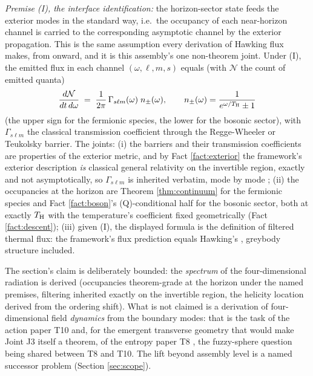 \begin{assembly}\label{asm:greybody}
\emph{Premise (I), the interface identification:} the horizon-sector state feeds the exterior modes in the standard way, i.e.\ the occupancy of each near-horizon channel is carried to the corresponding asymptotic channel by the exterior propagation. This is the same assumption every derivation of Hawking flux makes, from \cite{Hawking1975} onward, and it is this assembly's one non-theorem joint. Under (I), the emitted flux in each channel $(\omega, \ell, m, s)$ equals (with $\mathcal{N}$ the count of emitted quanta)
\[
\frac{d\mathcal{N}}{dt\,d\omega} \;=\; \frac{1}{2\pi}\,\Gamma_{s\ell m}(\omega)\; n_\pm(\omega), \qquad
n_\pm(\omega) = \frac{1}{e^{\omega/T_{\mathrm{H}}} \pm 1}
\]
(the upper sign for the fermionic species, the lower for the bosonic sector), with $\Gamma_{s\ell m}$ the classical transmission coefficient through the Regge-Wheeler or Teukolsky barrier. The joints: (i) the barriers and their transmission coefficients are properties of the exterior metric, and by Fact \ref{fact:exterior} the framework's exterior description \emph{is} classical general relativity on the invertible region, exactly and not asymptotically, so $\Gamma_{s\ell m}$ is inherited verbatim, mode by mode \cite{ReggeWheeler1957, Teukolsky1973}; (ii) the occupancies at the horizon are Theorem \ref{thm:continuum} for the fermionic species and Fact \ref{fact:boson}'s (Q)-conditional half for the bosonic sector, both at exactly $T_{\mathrm{H}}$ with the temperature's coefficient fixed geometrically (Fact \ref{fact:descent}); (iii) given (I), the displayed formula is the definition of filtered thermal flux: the framework's flux prediction equals Hawking's \cite{Hawking1975, Page1976}, greybody structure included.
\end{assembly}

\begin{remark}\label{rem:liftscope}
The section's claim is deliberately bounded: the \emph{spectrum} of the four-dimensional radiation is derived (occupancies theorem-grade at the horizon under the named premises, filtering inherited exactly on the invertible region, the helicity location derived from the ordering shift). What is not claimed is a derivation of four-dimensional field \emph{dynamics} from the boundary modes: that is the task of the action paper T10 \cite{ButlerT10} and, for the emergent transverse geometry that would make Joint J3 itself a theorem, of the entropy paper T8 \cite{ButlerT8}, the fuzzy-sphere question being shared between T8 and T10. The lift beyond assembly level is a named successor problem (Section \ref{sec:scope}).
\end{remark}

